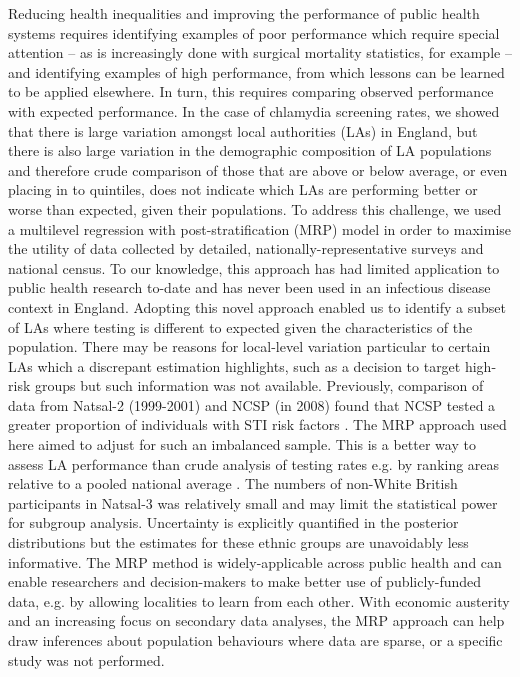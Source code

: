 \documentclass[fleqn,10pt]{wlscirep}
\begin{document}
Reducing health inequalities and improving the performance of public health systems requires identifying examples of poor performance which require special attention – as is increasingly done with surgical mortality statistics, for example – and identifying examples of high performance, from which lessons can be learned to be applied elsewhere. In turn, this requires comparing observed performance with expected performance. In the case of chlamydia screening rates, we showed that there is large variation amongst local authorities (LAs) in England, but there is also large variation in the demographic composition of LA populations and therefore crude comparison of those that are above or below average, or even placing in to quintiles, does not indicate which LAs are performing better or worse than expected, given their populations. To address this challenge, we used a multilevel regression with post-stratification (MRP) model in order to maximise the utility of data collected by detailed, nationally-representative surveys and national census.  To our knowledge, this approach has had limited application to public health research to-date \cite{Zhang2013} and has never been used in an infectious disease context in England. Adopting this novel approach enabled us to identify a subset of LAs where testing is different to expected given the characteristics of the population. There may be reasons for local-level variation particular to certain LAs which a discrepant estimation highlights, such as a decision to target high-risk groups but such information was not available.
Previously, comparison of data from Natsal-2 (1999-2001) and NCSP (in 2008) found that NCSP tested a greater proportion of individuals with STI risk factors \cite{Riha2011}. The MRP approach used here aimed to adjust for such an imbalanced sample. This is a better way to assess LA performance than crude analysis of testing rates e.g. by ranking areas relative to a pooled national average \cite{Editorial2016}. 
The numbers of non-White British participants in Natsal-3 was relatively small and may limit the statistical power for subgroup analysis. Uncertainty is explicitly quantified in the posterior distributions but the estimates for these ethnic groups are unavoidably less informative.
The MRP method is widely-applicable across public health and can enable researchers and decision-makers to make better use of publicly-funded data, e.g. by allowing localities to learn from each other. With economic austerity and an increasing focus on secondary data analyses, the MRP approach can help draw inferences about population behaviours where data are sparse, or a specific study was not performed.
\end{document}
